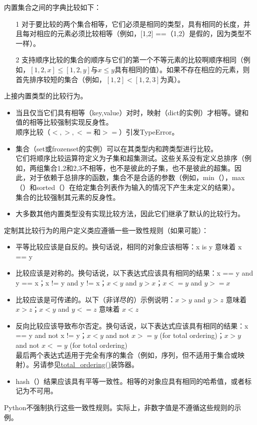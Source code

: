 \documentclass[10pt,UTF8]{ctexart}
\begin{document}
内置集合之间的字典比较如下：
\begin{itemize}
\item[1] 对于要比较的两个集合相等，它们必须是相同的类型，具有相同的长度，并且每对相应的元素必须比较相等（例如，[1,2] ==（1,2）是假的，因为类型不一样）。
\item[2] 支持顺序比较的集合的顺序与它们的第一个不等元素的比较啊顺序相同（例如，$[1,2,x] \leq [1,2,y]$与$x \leq y$具有相同的值）。如果不存在相应的元素，则首先排序较短的集合（例如，$[1,2] <[1,2,3]$为真）。
\end{itemize}
\indent 上接内置类型的比较行为。
\begin{itemize}
\item 当且仅当它们具有相等（key,value）对时，映射（dict的实例）才相等。键和值的相等比较强制实现反身性。\\
\indent 顺序比较（$<, >, <=\textit{和}> =$）引发TypeError。
\item 集合（set或frozenset的实例）可以在其类型内和跨类型进行比较。\\
\indent 它们将顺序比较运算符定义为子集和超集测试。这些关系没有定义总排序（例如，两组集合{1,2}和{2,3}不相等，也不是彼此的子集，也不是彼此的超集。因此，对于依赖于总排序的函数，集合不是合适的参数（例如，min（），max（）和sorted（）在给定集合列表作为输入的情况下产生未定义的结果）。\\
\indent 集合的比较强制其元素的反身性。
\item 大多数其他内置类型没有实现比较方法，因此它们继承了默认的比较行为。
\end{itemize}
\indent 定制其比较行为的用户定义类应遵循一些一致性规则（如果可能）：
\begin{itemize}
\item 平等比较应该是自反的。换句话说，相同的对象应该相等：x is y 意味着 x == y
\item 比较应该是对称的。换句话说，以下表达式应该具有相同的结果：x == y and y == x；x != y and y != x；$x < y$ and $y > x$；$x <= y$ and $y >= x$
\item 比较应该是可传递的。以下（非详尽的）示例说明：$x > y$ and $y > z$ 意味着 $x > z$；$x < y$ and $y <= z$ 意味着 $x < z$
\item 反向比较应该导致布尔否定。换句话说，以下表达式应该具有相同的结果：x == y and not x != y；$x < y$ and not $x >= y$ (for total ordering)；$x > y$ and not $x <= y$ (for total ordering)\\
\indent 最后两个表达式适用于完全有序的集合（例如，序列，但不适用于集合或映射）。另请参见\href{https://docs.python.org/3/library/functools.html#functools.total_ordering}{total_ordering()}装饰器。
\item hash（）结果应该具有平等一致性。相等的对象应具有相同的哈希值，或者标记为不可用。
\end{itemize}
\indent Python不强制执行这些一致性规则。实际上，非数字值是不遵循这些规则的示例。
\end{document}

